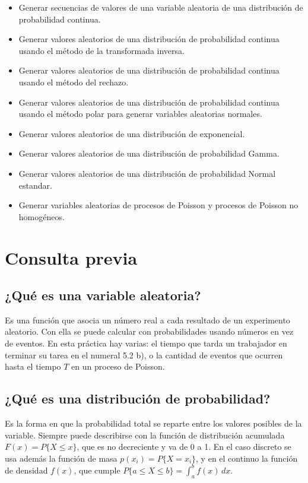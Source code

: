 \documentclass[11pt,letterpaper]{article}
\begin{document}
\begin{itemize}[itemsep=2pt]
    \item Generar secuencias de valores de una variable aleatoria de una distribución de probabilidad continua.
    \item Generar valores aleatorios de una distribución de probabilidad continua usando el método de la transformada inversa.
    \item Generar valores aleatorios de una distribución de probabilidad continua usando el método del rechazo.
    \item Generar valores aleatorios de una distribución de probabilidad continua usando el método polar para generar variables aleatorias normales.
    \item Generar valores aleatorios de una distribución de exponencial.
    \item Generar valores aleatorios de una distribución de probabilidad Gamma.
    \item Generar valores aleatorios de una distribución de probabilidad Normal estandar.
    \item Generar variables aleatorias de procesos de Poisson y procesos de Poisson no homogéneos.
\end{itemize}

\section{Consulta previa}

\subsection{¿Qué es una variable aleatoria?}

Es una función que asocia un número real a cada resultado de un experimento aleatorio. Con ella se
puede calcular con probabilidades usando números en vez de eventos. En esta práctica hay varias: el
tiempo que tarda un trabajador en terminar su tarea en el numeral 5.2 b), o la cantidad de eventos que
ocurren hasta el tiempo $T$ en un proceso de Poisson.

\subsection{¿Qué es una distribución de probabilidad?}

Es la forma en que la probabilidad total se reparte entre los valores posibles de la variable. Siempre
puede describirse con la función de distribución acumulada $F(x) = P\{X \le x\}$, que es no
decreciente y va de 0 a 1. En el caso discreto se usa además la función de masa
$p(x_i) = P\{X = x_i\}$, y en el continuo la función de densidad $f(x)$, que cumple
$P\{a \le X \le b\} = \int_a^b f(x)\,dx$.
\end{document}
